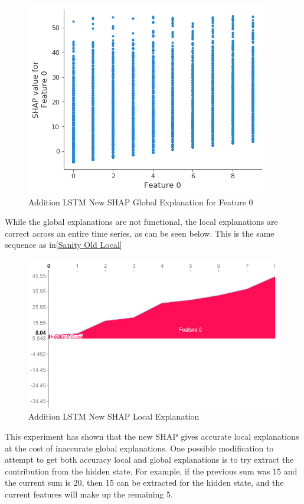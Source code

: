 \documentclass[12pt]{article}
\begin{document}
\begin{figure}[H]
\centering\caption{Addition LSTM New SHAP Global Explanation for Feature 0}
\includegraphics[scale=0.5]{Sanity New Global Feature.png}
\end{figure}
While the global explanations are not functional, the local explanations are correct across an entire time series, as can be seen below. This is the same sequence as in\ref{Sanity Old Local}

\begin{figure}[H]
\centering\caption{Addition LSTM New SHAP Local Explanation}
\includegraphics[scale=0.6]{Sanity New Local.png}
\end{figure}

This experiment has shown that the new SHAP gives accurate local explanations at the cost of inaccurate global explanations. One possible modification to attempt to get both accuracy local and global explanations is to try extract the contribution from the hidden state. For example, if the previous sum was 15 and the current sum is 20, then 15 can be extracted for the hidden state, and the current features will make up the remaining 5. 
\end{document}
